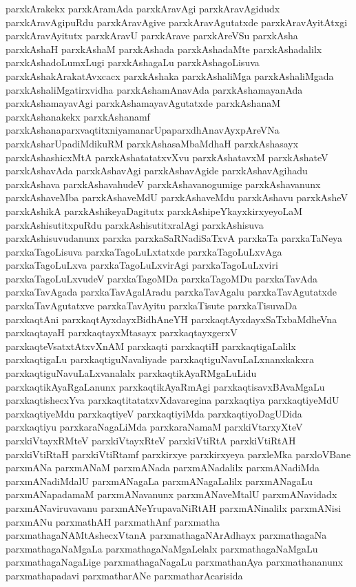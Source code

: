 {parxkArakekx
parxkAramAda
parxkAravAgi
parxkAravAgidudx
parxkAravAgipuRdu
parxkAravAgive
parxkAravAgutatxde
parxkAravAyitAtxgi
parxkAravAyitutx
parxkAravU
parxkArave
parxkAreVSu
parxkAsha
parxkAshaH
parxkAshaM
parxkAshada
parxkAshadaMte
parxkAshadalilx
parxkAshadoLumxLugi
parxkAshagaLu
parxkAshagoLisuva
parxkAshakArakatAvxcacx
parxkAshaka
parxkAshaliMga
parxkAshaliMgada
parxkAshaliMgatirxvidha
parxkAshamAnavAda
parxkAshamayanAda
parxkAshamayavAgi
parxkAshamayavAgutatxde
parxkAshanaM
parxkAshanakekx
parxkAshanamf
parxkAshanaparxvaqtitxniyamanarUpaparxdhAnavAyxpAreVNa
parxkAsharUpadiMdikuRM
parxkAshasaMbaMdhaH
parxkAshasayx
parxkAshashicxMtA
parxkAshatatatxvXvu
parxkAshatavxM
parxkAshateV
parxkAshavAda
parxkAshavAgi
parxkAshavAgide
parxkAshavAgihadu
parxkAshava
parxkAshavahudeV
parxkAshavanogumige
parxkAshavanunx
parxkAshaveMba
parxkAshaveMdU
parxkAshaveMdu
parxkAshavu
parxkAsheV
parxkAshikA
parxkAshikeyaDagitutx
parxkAshipeYkayxkirxyeyoLaM
parxkAshisutitxpuRdu
parxkAshisutitxralAgi
parxkAshisuva
parxkAshisuvudanunx
parxka
parxkaSaRNadiSaTxvA
parxkaTa
parxkaTaNeya
parxkaTagoLisuva
parxkaTagoLuLxtatxde
parxkaTagoLuLxvAga
parxkaTagoLuLxva
parxkaTagoLuLxvirAgi
parxkaTagoLuLxviri
parxkaTagoLuLxvudeV
parxkaTagoMDa
parxkaTagoMDu
parxkaTavAda
parxkaTavAgada
parxkaTavAgalAradu
parxkaTavAgalu
parxkaTavAgutatxde
parxkaTavAgutatxve
parxkaTavAyitu
parxkaTisute
parxkaTisuvaDa
parxkaqtAni
parxkaqtAyxdayxBidhAneYH
parxkaqtAyxdayxSaTxbaMdheVna
parxkaqtayaH
parxkaqtayxMtasayx
parxkaqtayxgerxV
parxkaqteVsatxtAtxvXnAM
parxkaqti
parxkaqtiH
parxkaqtigaLalilx
parxkaqtigaLu
parxkaqtiguNavaliyade
parxkaqtiguNavuLaLxnanxkakxra
parxkaqtiguNavuLaLxvanalalx
parxkaqtikAyaRMgaLuLidu
parxkaqtikAyaRgaLanunx
parxkaqtikAyaRmAgi
parxkaqtisavxBAvaMgaLu
parxkaqtishecxYva
parxkaqtitatatxvXdavaregina
parxkaqtiya
parxkaqtiyeMdU
parxkaqtiyeMdu
parxkaqtiyeV
parxkaqtiyiMda
parxkaqtiyoDagUDida
parxkaqtiyu
parxkaraNagaLiMda
parxkaraNamaM
parxkiVtarxyXteV
parxkiVtayxRMteV
parxkiVtayxRteV
parxkiVtiRtA
parxkiVtiRtAH
parxkiVtiRtaH
parxkiVtiRtamf
parxkirxye
parxkirxyeya
parxleMka
parxloVBane
parxmANa
parxmANaM
parxmANada
parxmANadalilx
parxmANadiMda
parxmANadiMdalU
parxmANagaLa
parxmANagaLalilx
parxmANagaLu
parxmANapadamaM
parxmANavanunx
parxmANaveMtalU
parxmANavidadx
parxmANaviruvavanu
parxmANeYrupavaNiRtAH
parxmANinalilx
parxmANisi
parxmANu
parxmathAH
parxmathAnf
parxmatha
parxmathagaNAMtAshecxVtanA
parxmathagaNArAdhayx
parxmathagaNa
parxmathagaNaMgaLa
parxmathagaNaMgaLelalx
parxmathagaNaMgaLu
parxmathagaNagaLige
parxmathagaNagaLu
parxmathanAya
parxmathananunx
parxmathapadavi
parxmatharANe
parxmatharAcarisida
}
